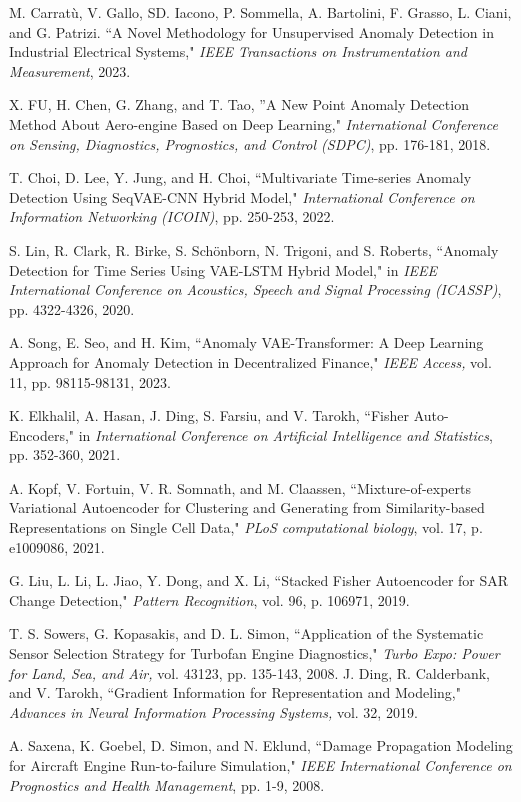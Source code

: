 \documentclass[journal]{IEEEtran}
\begin{document}
\begin{thebibliography}{00}
 M. Carratù, V. Gallo, SD. Iacono, P. Sommella, A. Bartolini, F. Grasso, L. Ciani, and G. Patrizi. ``A Novel Methodology for Unsupervised Anomaly Detection in Industrial Electrical Systems," \textit{IEEE Transactions on Instrumentation and Measurement}, 2023.

 X. FU, H. Chen, G. Zhang, and T. Tao, ''A New Point Anomaly Detection Method About Aero-engine Based on Deep Learning," \textit{International Conference on Sensing, Diagnostics, Prognostics, and Control (SDPC)}, pp. 176-181, 2018.


 T. Choi, D. Lee, Y. Jung, and H. Choi, ``Multivariate Time-series Anomaly Detection Using SeqVAE-CNN Hybrid Model," \textit{International Conference on Information Networking (ICOIN)}, pp. 250-253, 2022.

 S. Lin, R. Clark, R. Birke, S. Schönborn, N. Trigoni, and S. Roberts, ``Anomaly Detection for Time Series Using VAE-LSTM Hybrid Model," in \textit{IEEE International Conference on Acoustics, Speech and Signal Processing (ICASSP)}, pp. 4322-4326, 2020.

 A. Song, E. Seo, and H. Kim, ``Anomaly VAE-Transformer: A Deep Learning Approach for Anomaly Detection in Decentralized Finance," \textit{IEEE Access,}  vol. 11, pp. 98115-98131, 2023.

 K. Elkhalil, A. Hasan, J. Ding, S. Farsiu, and V. Tarokh, ``Fisher Auto-Encoders," in \textit{International Conference on Artificial Intelligence and Statistics}, pp. 352-360, 2021.

 A. Kopf, V. Fortuin, V. R. Somnath, and M. Claassen, ``Mixture-of-experts Variational Autoencoder for Clustering and Generating from Similarity-based Representations on Single Cell Data," \textit{PLoS computational biology}, vol. 17, p. e1009086, 2021.

 G. Liu, L. Li, L. Jiao, Y. Dong,  and X. Li, ``Stacked Fisher Autoencoder for SAR Change Detection," \textit{Pattern Recognition}, vol. 96, p. 106971, 2019.


 T. S. Sowers, G. Kopasakis, and D. L. Simon, ``Application of the Systematic Sensor Selection Strategy for Turbofan Engine Diagnostics," \textit{Turbo Expo: Power for Land, Sea, and Air,} vol. 43123, pp. 135-143, 2008.
 J. Ding, R. Calderbank, and V. Tarokh, ``Gradient Information for Representation and Modeling," \textit{Advances in Neural Information Processing Systems,} vol. 32, 2019.

 A. Saxena, K. Goebel, D. Simon, and N. Eklund, ``Damage Propagation Modeling for Aircraft Engine Run-to-failure Simulation," \textit{ IEEE International Conference on Prognostics and Health Management}, pp. 1-9, 2008.


\end{thebibliography}
\end{document}
